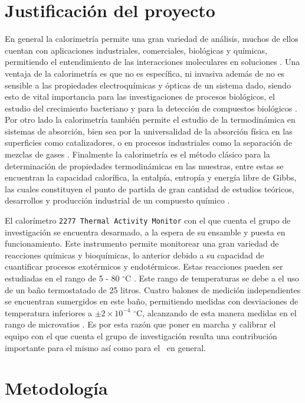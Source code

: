 \section{Justificación del proyecto}
	En general la calorimetría permite una gran variedad de análisis, muchos de ellos cuentan con aplicaciones industriales, comerciales, biológicas y químicas, permitiendo el entendimiento de las interacciones moleculares en soluciones \cite{blandamer1998titration}. Una ventaja de la calorimetría es que no es específica, ni invasiva además de no es sensible a las propiedades electroquímicas y ópticas de un sistema dado, siendo esto de vital importancia para las investigaciones de procesos biológicos, el estudio del crecimiento bacteriano y para la detección de compuestos biológicos \cite{winkelmann2004application}. Por otro lado la calorimetría también permite el estudio de la termodinámica en sistemas de absorción, bien sea por la universalidad de la absorción física en las superficies como catalizadores, o en procesos industriales como la separación de mezclas de gases \cite{morrison1987calorimetry}. Finalmente la calorimetría es el método clásico para la determinación de propiedades termodinámicas en las muestras, entre estas se encuentran la capacidad calorífica, la entalpía, entropía y energía libre de Gibbs, las cuales constituyen el punto de partida de gran cantidad de estudios teóricos, desarrollos y producción industrial de un compuesto químico \cite{wang2005determination, gaisford2016principles}.

	El calorímetro \texttt{2277 Thermal Activity Monitor} con el que cuenta el grupo de investigación se encuentra desarmado, a la espera de su ensamble y puesta en funcionamiento. Este instrumento permite monitorear una gran variedad de reacciones químicas y bioquímicas, lo anterior debido a su capacidad de cuantificar procesos exotérmicos y endotérmicos. Estas reacciones pueden ser estudiadas en el rango de 5 - 80 $^\circ$C \cite{Suurkuusk}. Este rango de temperaturas se debe a el uso de un baño termostatado de 25 litros. Cuatro balones de medición independientes se encuentran sumergidos en este baño, permitiendo medidas con desviaciones de temperatura inferiores a $\pm2\times10^{-4}$ $^\circ$C, alcanzando de esta manera medidas en el rango de microvatios \cite{Suurkuusk}. Es por esta razón que poner en marcha y calibrar el equipo con el que cuenta el grupo de investigación resulta una contribución importante para el mismo así como para el \deptname\ en general.
	
\section{Metodología}
	

